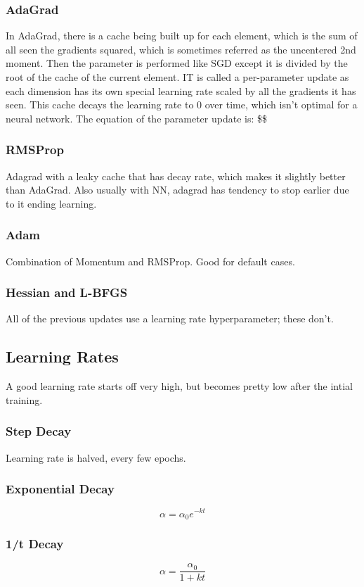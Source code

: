 \documentclass[11pt]{article}
\begin{document}
\begin{enumerate}
\subsubsection{AdaGrad}
\label{sec-2-8-4}
In AdaGrad, there is a cache being built up for each element, which is the sum of all seen the gradients squared, which is sometimes referred as the uncentered 2nd moment.
Then the parameter is performed like SGD except it is divided by the root of the cache of the current element. IT is called a per-parameter update as each dimension has its own 
special learning rate scaled by all the gradients it has seen. This cache decays the learning rate to 0 over time, which isn't optimal for a neural network. The equation of the parameter update is:
\$\$
\subsubsection{RMSProp}
\label{sec-2-8-5}
Adagrad with a leaky cache that has decay rate, which makes it slightly better than AdaGrad. Also usually with NN, adagrad has tendency to stop earlier due to it ending learning.
\subsubsection{Adam}
\label{sec-2-8-6}
Combination of Momentum and RMSProp. Good for default cases.
\subsubsection{Hessian and L-BFGS}
\label{sec-2-8-7}
All of the previous updates use a learning rate hyperparameter; these don't.
\subsection{Learning Rates}
\label{sec-2-9}
A good learning rate starts off very high, but becomes pretty low after the intial training.
\subsubsection{Step Decay}
\label{sec-2-9-1}
Learning rate is halved, every few epochs.
\subsubsection{Exponential Decay}
\label{sec-2-9-2}
$$\alpha = \alpha_0 e^{-kt}$$
\subsubsection{1/t Decay}
\label{sec-2-9-3}
$$\alpha = \frac{\alpha_0}{1+kt} $$

\end{enumerate}
\end{document}
